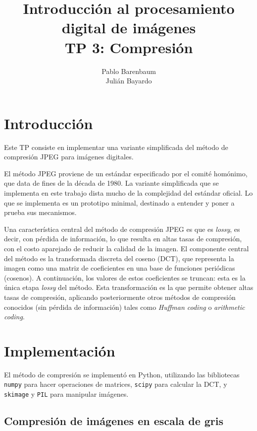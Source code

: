 \documentclass{article}
\title{
  Introducci\'on al procesamiento digital de im\'agenes \\
  {\bf TP 3: Compresi\'on}
}
\author{
  Pablo Barenbaum \\
  Juli\'an Bayardo
}
\date{}
\begin{document}
\maketitle
\tableofcontents

\section{Introducción}

Este TP consiste en implementar una variante simplificada del método
de compresión JPEG para imágenes digitales.

El método JPEG proviene de un estándar especificado por el comité homónimo,
que data de fines de la década de 1980.
La variante simplificada que se implementa en este trabajo
dista mucho de la complejidad del estándar oficial.
Lo que se implementa es un prototipo minimal,
destinado a entender y poner a prueba sus mecanismos.

Una característica central del método de compresión JPEG es que es {\em lossy},
es decir, con pérdida de información,
lo que resulta en altas tasas de compresión,
con el costo aparejado de reducir la calidad de la imagen.
El componente central del método es la
transformada discreta del coseno (DCT), que representa la imagen
como una matriz de coeficientes en una base de funciones periódicas
(cosenos).
A continuación, los valores de estos coeficientes se truncan:
esta es la única etapa {\em lossy} del método.
Esta transformación es la que permite obtener altas tasas de compresión,
aplicando posteriormente otros métodos de compresión conocidos
(sin pérdida de información) tales como {\em Huffman coding}
o {\em arithmetic coding}.

\section{Implementación}

El método de compresión se implementó en Python, utilizando
las bibliotecas
\texttt{numpy} para hacer operaciones de matrices,
\texttt{scipy} para calcular la DCT,
y \texttt{skimage} y \texttt{PIL} para manipular imágenes.

\subsection{Compresión de imágenes en escala de gris}
\end{document}
